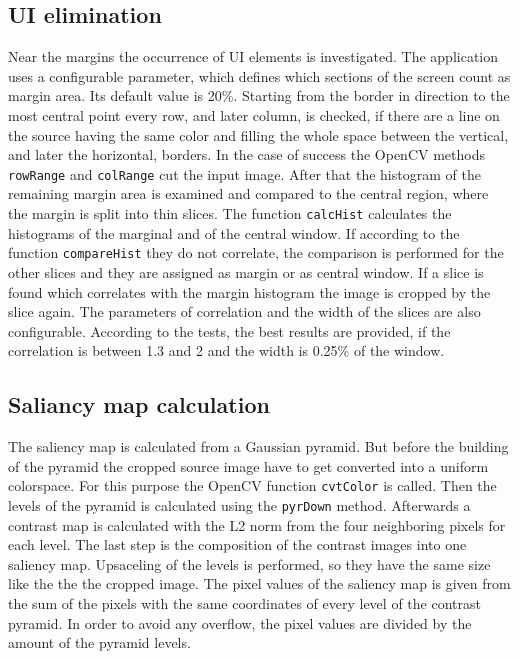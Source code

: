 \documentclass[draft,final]{vutinfth} %
\begin{document}
\subsection{UI elimination}
Near the margins the occurrence of UI elements is investigated.
The application uses a configurable parameter, which defines which sections of the screen count as margin area. 
Its default value is 20\%. 
Starting from the border in direction to the most central point every row, and later column, is checked, if there are a line on the source having the same color and filling the whole space between the vertical, and later the horizontal, borders.
In the case of success the OpenCV methods \texttt{rowRange} and \texttt{colRange} cut the input image.
After that the histogram of the remaining margin area is examined and compared to the central region, where the margin is split into thin slices.
The function \texttt{calcHist} calculates the histograms of the marginal and of the central window.
If according to the function \texttt{compareHist} they do not correlate, the comparison is performed for the other slices and they are assigned as margin or as central window.
If a slice is found which correlates with the margin histogram the image is cropped by the slice again. 
The parameters of correlation and the width of the slices are also configurable.
According to the tests, the best results are provided, if the correlation is between 1.3 and 2 and the width is 0.25\% of the window.

\subsection{Saliancy map calculation}
The saliency map is calculated from a Gaussian pyramid.
But before the building of the pyramid the cropped source image have to get converted into a uniform colorspace.
For this purpose the OpenCV function \texttt{cvtColor} is called.
Then the levels of the pyramid is calculated using the \texttt{pyrDown} method.
Afterwards a contrast map is calculated with the L2 norm from the four neighboring pixels for each level.
The last step is the composition of the contrast images into one saliency map.
Upsaceling of the levels is performed, so they have the same size like the the the cropped image.
The pixel values of the saliency map is given from the sum of the pixels with the same coordinates of every level of the contrast pyramid. 
In order to avoid any overflow, the pixel values are divided by the amount of the pyramid levels.
\end{document}
